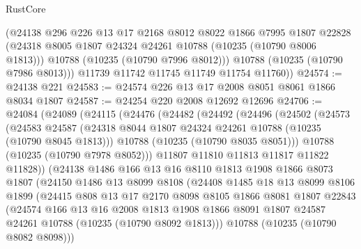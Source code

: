 \begin{lexlean}{RustCore}
\begin{coremodule}
          (@24138
            @296
            @226
            @13
            @17
            @2168
            @8012
            @8022
            @1866
            @7995
            @1807
            @22828
            (@24318 @8005 @1807 @24324 @24261 @10788 (@10235 (@10790 @8006 @1813)))
            @10788
            (@10235 (@10790 @7996 @8012)))
          @10788
          (@10235 (@10790 @7986 @8013)))
        @11739
        @11742
        @11745
        @11749
        @11754
        @11760))
@24574 := @24138 @221
@24583 := @24574 @226 @13 @17 @2008 @8051 @8061 @1866 @8034 @1807
@24587 := @24254 @220 @2008 @12692 @12696
@24706 := @24084
    (@24089
      (@24115
        (@24476
          (@24482
            (@24492
              (@24496
                (@24502
                  (@24573
                    (@24583
                      @24587
                      (@24318 @8044 @1807 @24324 @24261 @10788 (@10235 (@10790 @8045 @1813)))
                      @10788
                      (@10235 (@10790 @8035 @8051)))
                    @10788
                    (@10235 (@10790 @7978 @8052)))
                  @11807
                  @11810
                  @11813
                  @11817
                  @11822
                  @11828))
              (@24138
                @1486
                @166
                @13
                @16
                @8110
                @1813
                @1908
                @1866
                @8073
                @1807
                (@24150
                  @1486
                  @13
                  @8099
                  @8108
                  (@24408
                    @1485
                    @18
                    @13
                    @8099
                    @8106
                    @1899
                    (@24415
                      @808
                      @13
                      @17
                      @2170
                      @8098
                      @8105
                      @1866
                      @8081
                      @1807
                      @22843
                      (@24574
                        @166
                        @13
                        @16
                        @2008
                        @1813
                        @1908
                        @1866
                        @8091
                        @1807
                        @24587
                        @24261
                        @10788
                        (@10235 (@10790 @8092 @1813)))
                      @10788
                      (@10235 (@10790 @8082 @8098)))

\end{coremodule}
\end{lexlean}
